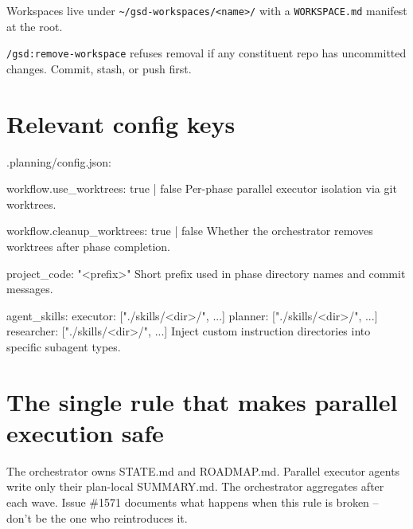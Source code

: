 \documentclass[11pt,letterpaper,openany]{book}
\begin{document}
Workspaces live under \texttt{\textasciitilde/gsd-workspaces/<name>/} with a
\texttt{WORKSPACE.md} manifest at the root.

\begin{gsdwarning}
\texttt{/gsd:remove-workspace} refuses removal if any constituent repo has
uncommitted changes. Commit, stash, or push first.
\end{gsdwarning}

\section*{Relevant config keys}

\begin{gsdplain}
.planning/config.json:

  workflow.use_worktrees: true | false
      Per-phase parallel executor isolation via git worktrees.

  workflow.cleanup_worktrees: true | false
      Whether the orchestrator removes worktrees after phase completion.

  project_code: "<prefix>"
      Short prefix used in phase directory names and commit messages.

  agent_skills:
    executor:   ["./skills/<dir>/", ...]
    planner:    ["./skills/<dir>/", ...]
    researcher: ["./skills/<dir>/", ...]
      Inject custom instruction directories into specific subagent types.
\end{gsdplain}

\section*{The single rule that makes parallel execution safe}

\begin{gsdimportant}
The orchestrator owns STATE.md and ROADMAP.md. Parallel executor agents
write only their plan-local SUMMARY.md. The orchestrator aggregates after
each wave. Issue \#1571 documents what happens when this rule is broken --
don't be the one who reintroduces it.
\end{gsdimportant}
\end{document}

